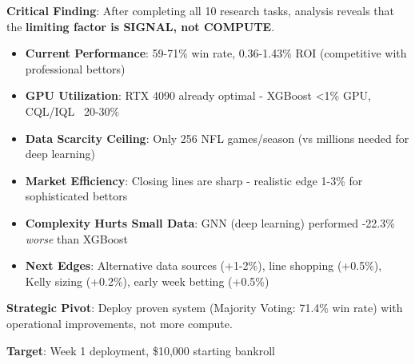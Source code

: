 

\textbf{Critical Finding}: After completing all 10 research tasks, analysis reveals that the \textbf{limiting factor is SIGNAL, not COMPUTE}.

\begin{itemize}
  \item \textbf{Current Performance}: 59-71\% win rate, 0.36-1.43\% ROI (competitive with professional bettors)
  \item \textbf{GPU Utilization}: RTX 4090 already optimal - XGBoost <1\% GPU, CQL/IQL ~20-30\%
  \item \textbf{Data Scarcity Ceiling}: Only 256 NFL games/season (vs millions needed for deep learning)
  \item \textbf{Market Efficiency}: Closing lines are sharp - realistic edge 1-3\% for sophisticated bettors
  \item \textbf{Complexity Hurts Small Data}: GNN (deep learning) performed -22.3\% \textit{worse} than XGBoost
  \item \textbf{Next Edges}: Alternative data sources (+1-2\%), line shopping (+0.5\%), Kelly sizing (+0.2\%), early week betting (+0.5\%)
\end{itemize}

\textbf{Strategic Pivot}: Deploy proven system (Majority Voting: 71.4\% win rate) with operational improvements, not more compute.

\textbf{Target}: Week 1 deployment, \$10,000 starting bankroll

